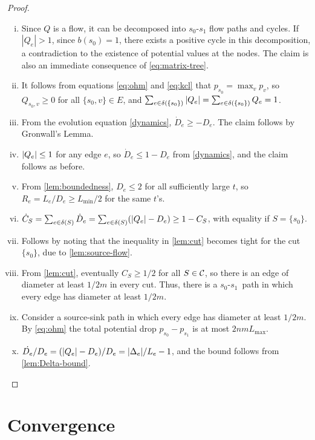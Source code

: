 \documentclass[11pt,a4paper]{article}
\renewcommand{\source}{\ensuremath{s_0}}
\renewcommand{\sink}{\ensuremath{s_1}}
\newcommand{\Lmin}{\ensuremath{L_{\mathrm{min}}}}
\newcommand{\Lmax}{\ensuremath{L_{\mathrm{max}}}}
\newcommand{\diverg}{b}
\newcommand{\negskip}{\vspace{-2em}\par}\newcommand{\Lnegskip}{\vspace{-3em}\par}
\begin{document}
\begin{proof}
\begin{enumerate}[(i)]
\item 
Since $Q$ is a flow, it can be decomposed into $s_0$-$s_1$ flow paths and
cycles. If $|Q_e| > 1$, since $\diverg(s_0)=1$, there exists a positive cycle in
this decomposition, a contradiction to the existence of potential values at
the nodes. The claim is also an immediate consequence of \eqref{eq:matrix-tree}. 
\item
It follows from equations \eqref{eq:ohm} and \eqref{eq:kcl} that $p_{s_0}=\max_v p_v$, so $Q_{s_0,v} \ge 0$ for all $\{s_0,v\} \in E$, and $\sum_{e \in \delta(\{s_0\})} | Q_e | = \sum_{e \in \delta(\{s_0\})} Q_e = 1$.  
\item 
From the evolution equation \eqref{dynamics}, $\dot{D}_e \ge - D_e$. The claim follows by Gronwall's Lemma. 
\item
$| Q_e | \le 1$ for any edge $e$, so $\dot{D}_e \le 1 - D_e$ from \eqref{dynamics}, and the claim follows as before.  
\item
From \eqref{lem:boundedness}, $D_e \le 2$ for all sufficiently large $t$, so $R_e = L_e/D_e \ge \Lmin/2$ for the same $t$'s. 
\item
$\dot{C}_S = \sum_{e \in \delta(S)} \dot{D}_e = \sum_{e \in \delta(S)} (| Q_e | - D_e) \ge 1 - C_S $, with equality if $S=\{s_0\}$.
\item
Follows by noting that the inequality in \eqref{lem:cut} becomes tight for the cut $\{s_0\}$, due to \eqref{lem:source-flow}. 
\item
From \eqref{lem:cut}, eventually $C_S \ge 1/2$ for all $S \in {\cal C}$, so there
is an edge of diameter at least $1/2m$ in every cut. Thus, there is a
\source-\sink\ path in which every edge has diameter at least $1/2m$.
\item Consider a source-sink path in which every edge has diameter at least
$1/2m$. By \eqref{eq:ohm} the total potential drop $p_{\source}- p_{\sink}$ is at most $2nm \Lmax$. 
\item 
$ \dot{D_e}/D_e = (| Q_e | - D_e) / D_e = | \Delta_e |/L_e - 1$, and the bound follows from \eqref{lem:Delta-bound}. 
\end{enumerate}\negskip
\end{proof}



\section{Convergence}\label{sec:Convergence-General}
\end{document}
